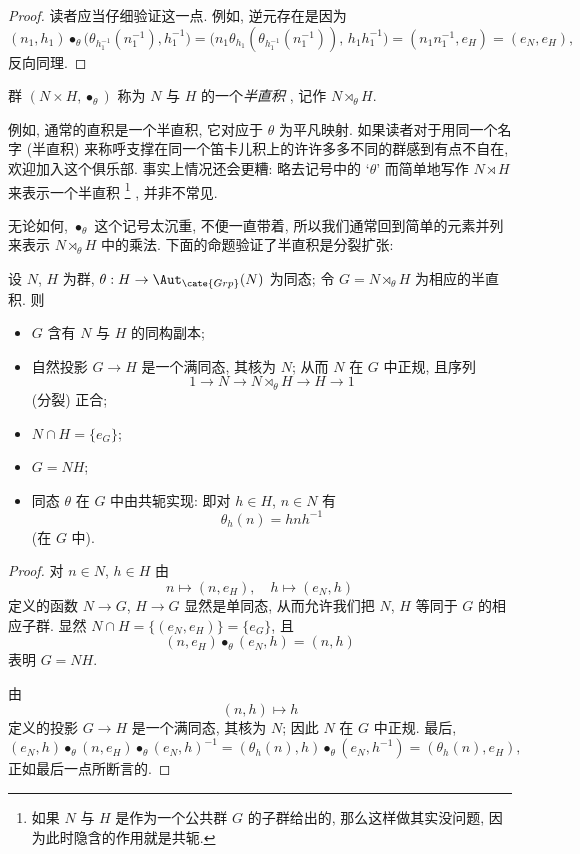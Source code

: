 \begin{proof}
读者应当仔细验证这一点. 例如, 逆元存在是因为
\[
(n_1, h_1) \bullet_{\theta} \bigl(\theta_{h_1^{-1}}(n_1^{-1}), h_1^{-1}\bigr)
= \bigl(n_1 \theta_{h_1}(\theta_{h_1^{-1}}(n_1^{-1})),\, h_1 h_1^{-1}\bigr)
= (n_1 n_1^{-1}, e_H) = (e_N, e_H),
\]
反向同理.
\end{proof}

\begin{definition}
\label{def:semidirect-product}
群 $(N \times H, \bullet_{\theta})$ 称为 $N$ 与 $H$ 的一个\emph{半直积}%
%
, 记作 $N \rtimes_{\theta} H$.
\end{definition}

例如, 通常的直积是一个半直积, 它对应于 $\theta$ 为平凡映射. 如果读者对于用同一个名字 (半直积) 来称呼支撑在同一个笛卡儿积上的许许多多不同的群感到有点不自在, 欢迎加入这个俱乐部. 事实上情况还会更糟: 略去记号中的 `$\theta$' 而简单地写作 $N \rtimes H$ 来表示一个半直积%
\footnote{如果 $N$ 与 $H$ 是作为一个公共群 $G$ 的子群给出的, 那么这样做其实没问题, 因为此时隐含的作用就是共轭.}%
, 并非不常见.

无论如何, $\bullet_{\theta}$ 这个记号太沉重, 不便一直带着, 所以我们通常回到简单的元素并列来表示 $N \rtimes_{\theta} H$ 中的乘法. 下面的命题验证了半直积是分裂扩张:

\begin{proposition}
\label{prop:semidirect-split}
设 $N$, $H$ 为群, $\theta : H \to \Aut_{\cate{Grp}}(N)$ 为同态; 令 $G = N \rtimes_{\theta} H$ 为相应的半直积. 则
\begin{itemize}
\item $G$ 含有 $N$ 与 $H$ 的同构副本;
\item 自然投影 $G \to H$ 是一个满同态, 其核为 $N$; 从而 $N$ 在 $G$ 中正规, 且序列
\[
1 \longrightarrow N \longrightarrow N \rtimes_{\theta} H \longrightarrow H \longrightarrow 1
\]
(分裂) 正合;
\item $N \cap H = \{e_G\}$;
\item $G = NH$;
\item 同态 $\theta$ 在 $G$ 中由共轭实现: 即对 $h \in H$, $n \in N$ 有
\[
\theta_h(n) = h n h^{-1}
\]
(在 $G$ 中).
\end{itemize}
\end{proposition}

\begin{proof}
对 $n \in N$, $h \in H$ 由
\[
n \mapsto (n, e_H), \quad h \mapsto (e_N, h)
\]
定义的函数 $N \to G$, $H \to G$ 显然是单同态, 从而允许我们把 $N$, $H$ 等同于 $G$ 的相应子群. 显然 $N \cap H = \{(e_N, e_H)\} = \{e_G\}$, 且
\[
(n, e_H) \bullet_{\theta} (e_N, h) = (n, h)
\]
表明 $G = NH$.

由
\[
(n, h) \mapsto h
\]
定义的投影 $G \to H$ 是一个满同态, 其核为 $N$; 因此 $N$ 在 $G$ 中正规. 最后,
\[
(e_N, h) \bullet_{\theta} (n, e_H) \bullet_{\theta} (e_N, h)^{-1}
= (\theta_h(n), h) \bullet_{\theta} (e_N, h^{-1})
= (\theta_h(n), e_H),
\]
正如最后一点所断言的.
\end{proof}

